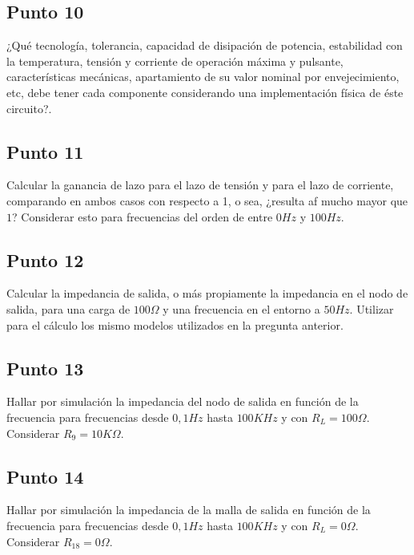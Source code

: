 \clearpage

\subsection{Punto 10}

¿Qué tecnología, tolerancia, capacidad de disipación de potencia, estabilidad con la temperatura, tensión y corriente de operación máxima y pulsante, características mecánicas, apartamiento de su valor nominal por envejecimiento, etc, debe tener cada componente considerando una implementación física de éste circuito?.

\clearpage

\subsection{Punto 11}

Calcular la ganancia de lazo  para el lazo de tensión y para el lazo de corriente, comparando en ambos casos con respecto a 1, o sea, ¿resulta af mucho mayor que $1$? Considerar esto para frecuencias del orden de entre $0 Hz$ y $100 Hz$.

\clearpage

\subsection{Punto 12}

Calcular la impedancia de salida, o más propiamente la impedancia en el nodo de salida, para una carga de $100 \Omega$ y una frecuencia en el entorno a $50Hz$. Utilizar para el cálculo los mismo modelos utilizados en la pregunta anterior.

\clearpage

\subsection{Punto 13}

Hallar por simulación la impedancia del nodo de salida en función de la frecuencia para frecuencias desde $0,1 Hz$ hasta $100 KHz$ y con $R_{L} = 100 \Omega$. Considerar $R_{9} = 10 K\Omega$.

\clearpage

\subsection{Punto 14}

Hallar por simulación la impedancia de la malla de salida en función de la frecuencia para frecuencias desde $0,1 Hz$ hasta $100 KHz$ y con  $R_{L} = 0 \Omega$. Considerar  $R_{18} = 0 \Omega$.

